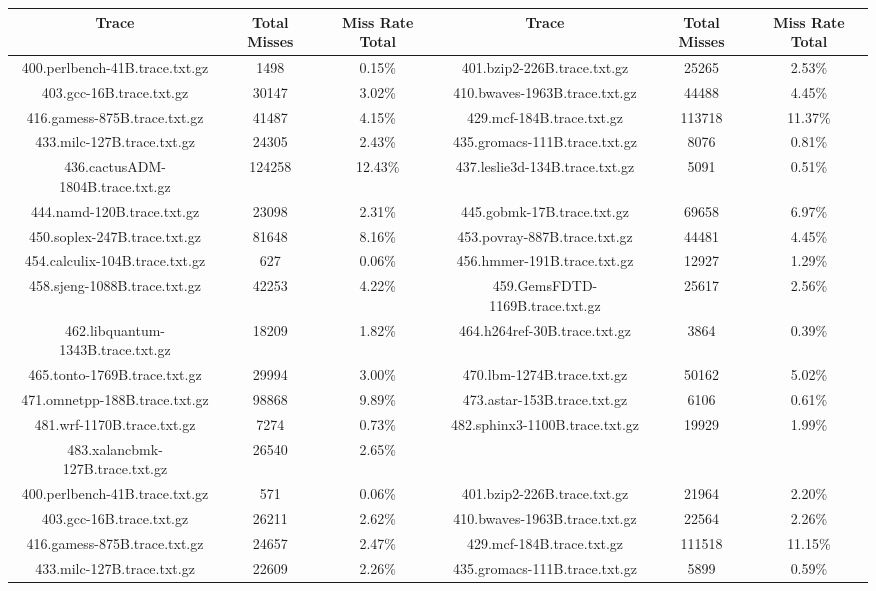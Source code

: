 \begin{table}[H]
\centering
\begin{tabular}{|c|c|c|c|c|c|}
\hline
Trace & Total Misses & Miss Rate Total & Trace & Total Misses & Miss Rate Total \\
\hline
400.perlbench-41B.trace.txt.gz & 1498 & 0.15\% & 401.bzip2-226B.trace.txt.gz & 25265 & 2.53\% \\
403.gcc-16B.trace.txt.gz & 30147 & 3.02\% & 410.bwaves-1963B.trace.txt.gz & 44488 & 4.45\% \\
416.gamess-875B.trace.txt.gz & 41487 & 4.15\% & 429.mcf-184B.trace.txt.gz & 113718 & 11.37\% \\
433.milc-127B.trace.txt.gz & 24305 & 2.43\% & 435.gromacs-111B.trace.txt.gz & 8076 & 0.81\% \\
436.cactusADM-1804B.trace.txt.gz & 124258 & 12.43\% & 437.leslie3d-134B.trace.txt.gz & 5091 & 0.51\% \\
444.namd-120B.trace.txt.gz & 23098 & 2.31\% & 445.gobmk-17B.trace.txt.gz & 69658 & 6.97\% \\
450.soplex-247B.trace.txt.gz & 81648 & 8.16\% & 453.povray-887B.trace.txt.gz & 44481 & 4.45\% \\
454.calculix-104B.trace.txt.gz & 627 & 0.06\% & 456.hmmer-191B.trace.txt.gz & 12927 & 1.29\% \\
458.sjeng-1088B.trace.txt.gz & 42253 & 4.22\% & 459.GemsFDTD-1169B.trace.txt.gz & 25617 & 2.56\% \\
462.libquantum-1343B.trace.txt.gz & 18209 & 1.82\% & 464.h264ref-30B.trace.txt.gz & 3864 & 0.39\% \\
465.tonto-1769B.trace.txt.gz & 29994 & 3.00\% & 470.lbm-1274B.trace.txt.gz & 50162 & 5.02\% \\
471.omnetpp-188B.trace.txt.gz & 98868 & 9.89\% & 473.astar-153B.trace.txt.gz & 6106 & 0.61\% \\
481.wrf-1170B.trace.txt.gz & 7274 & 0.73\% & 482.sphinx3-1100B.trace.txt.gz & 19929 & 1.99\% \\
483.xalancbmk-127B.trace.txt.gz & 26540 & 2.65\% & & & &  \\
400.perlbench-41B.trace.txt.gz & 571 & 0.06\% & 401.bzip2-226B.trace.txt.gz & 21964 & 2.20\% \\
403.gcc-16B.trace.txt.gz & 26211 & 2.62\% & 410.bwaves-1963B.trace.txt.gz & 22564 & 2.26\% \\
416.gamess-875B.trace.txt.gz & 24657 & 2.47\% & 429.mcf-184B.trace.txt.gz & 111518 & 11.15\% \\
433.milc-127B.trace.txt.gz & 22609 & 2.26\% & 435.gromacs-111B.trace.txt.gz & 5899 & 0.59\% \\

\end{tabular}
\end{table}
